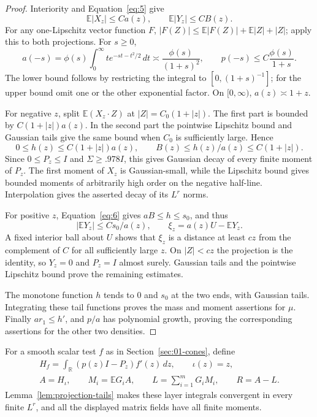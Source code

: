 \begin{proof}
Interiority and Equation~\eqref{eq:5} give
\[
\mathbb E|X_z|\le Ca(z),\qquad \mathbb E|Y_z|\le CB(z).
\]
For any one-Lipschitz vector function \(F\),
\(|F(Z)|\le\mathbb E|F(Z)|+\mathbb E|Z|+|Z|\); apply this to both projections. For \(s\ge0\),
\[
a(-s)=\phi(s)\int_0^\infty t e^{-st-t^2/2}\,dt
\asymp\frac{\phi(s)}{(1+s)^2},\qquad
p(-s)\le C\frac{\phi(s)}{1+s}.
\]
The lower bound follows by restricting the integral to \([0,(1+s)^{-1}]\); for the upper bound omit one or the other exponential factor. On \([0,\infty)\), \(a(z)\asymp1+z\).

For negative \(z\), split \(\mathbb E(X_z\cdot Z)\) at \(|Z|=C_0(1+|z|)\). The first part is bounded by \(C(1+|z|)a(z)\). In the second part the pointwise Lipschitz bound and Gaussian tails give the same bound when \(C_0\) is sufficiently large. Hence
\[
0\le h(z)\le C(1+|z|)a(z),\qquad B(z)\le h(z)/a(z)\le C(1+|z|).
\]
Since \(0\le P_z\le I\) and \(\Sigma\ge.978I\), this gives Gaussian decay of every finite moment of \(P_z\). The first moment of \(X_z\) is Gaussian-small, while the Lipschitz bound gives bounded moments of arbitrarily high order on the negative half-line. Interpolation gives the asserted decay of its \(L^r\) norms.

For positive \(z\), Equation~\eqref{eq:6} gives \(aB\le h\le s_0\), and thus
\[
|\mathbb EY_z|\le Cs_0/a(z),\qquad \xi_z=a(z)U-\mathbb EY_z.
\]
A fixed interior ball about \(U\) shows that \(\xi_z\) is a distance at least \(cz\) from the complement of \(C\) for all sufficiently large \(z\). On \(|Z|<cz\) the projection is the identity, so \(Y_z=0\) and \(P_z=I\) almost surely. Gaussian tails and the pointwise Lipschitz bound prove the remaining estimates.

The monotone function \(h\) tends to \(0\) and \(s_0\) at the two ends, with Gaussian tails. Integrating these tail functions proves the mass and moment assertions for \(\mu\). Finally \(ar_1\le h'\), and \(p/a\) has polynomial growth, proving the corresponding assertions for the other two densities.
\end{proof}

For a smooth scalar test \(f\) as in Section~\ref{sec:01-cones}, define
\[
\begin{gathered}
H_f=\int_{\mathbb R}(p(z)I-P_z)f'(z)\,dz,\qquad \iota(z)=z,\\
A=H_\iota,\qquad M_i=\mathbb E G_iA,\qquad
L=\sum_{i=1}^mG_iM_i,\qquad R=A-L.
\end{gathered}\tag{7}\label{eq:7}
\]
Lemma~\ref{lem:projection-tails} makes these layer integrals convergent in every finite \(L^r\), and all the displayed matrix fields have all finite moments.


